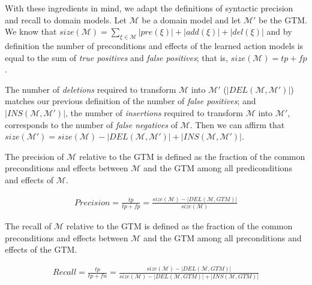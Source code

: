 With these ingredients in mind, we adapt the definitions of syntactic precision and recall to domain models. Let $\mathcal{M}$ be a domain model and let $\mathcal{M'}$ be the GTM. We know that $size(\mathcal{M}) = \sum_{\xi \in \mathcal{M}}\left|pre(\xi)\right| + \left|add(\xi)\right| + \left|del(\xi)\right|$ and by definition the number of preconditions and effects of the learned action models is equal to the sum of {\em true positives} and {\em false positives}; that is, $size(\mathcal{M}) = tp + fp$.

The number of \emph{deletions} required to transform $\mathcal{M}$ into $\mathcal{M'}$ ($\left|DEL(\mathcal{M},\mathcal{M'})\right|$) matches our previous definition of the number of {\em false positives}; and $\left|INS(\mathcal{M},\mathcal{M'})\right|$, the number of \emph{insertions} required to transform $\mathcal{M}$ into $\mathcal{M'}$, corresponds to the number of {\em false negatives} of $\mathcal{M}$. Then we can affirm that $size(\mathcal{M'}) = size(\mathcal{M}) - \left|DEL(\mathcal{M},\mathcal{M'})\right| + \left|INS(\mathcal{M},\mathcal{M'})\right|$.

\begin{mydefinition} \label{syn-precision} The precision of $\mathcal{M}$ relative to the GTM is defined as the fraction of the common preconditions and effects between $\mathcal{M}$ and the GTM among all prediconditions and effects of $\mathcal{M}$.
	\begin{small}
		\begin{align*}
		Precision=\frac{tp}{tp+fp}=\frac{size(\mathcal{M})- \left|DEL(\mathcal{M},GTM)\right|}{size(\mathcal{M})}
		\end{align*}
	\end{small}
\end{mydefinition}



\begin{mydefinition} \label{syn-recall} The recall of $\mathcal{M}$ relative to the GTM is defined as the fraction of the common preconditions and effects between $\mathcal{M}$ and the GTM among all preconditions and effects of the GTM.
	
	\begin{small}
		\begin{align*}
		Recall= \frac{tp}{tp+fn}=
		\frac{size(\mathcal{M})- \left|DEL(\mathcal{M},GTM)\right|}{size(\mathcal{M}) - \left|DEL(\mathcal{M},GTM)\right| + \left|INS(\mathcal{M},GTM)\right|}
		\end{align*}
	\end{small}
\end{mydefinition}

